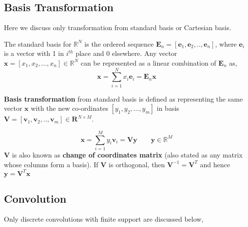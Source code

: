 

\begin{appendices}

\chapter{}
\section{Basis Transformation}

Here we discuss only transformation from standard \gls{basis} or Cartesian \gls{basis}.
\bigskip

\noindent The standard \gls{basis} for $\mathbb{R}^{N}$ is the ordered sequence $\textbf{E}_{n} = [\textbf{e}_{1}, \textbf{e}_{2}, ..,\textbf{e}_{n}]$, where $\textbf{e}_{i}$ is a vector with 1 in $\textit{i}^{th}$ place and 0 elsewhere. Any vector $\textbf{x} = [x_{1}, x_{2},...,x_{n}] \in \mathbb{R}^{N}$ can be represented as a \gls{linear combination} of $\textbf{E}_{n}$ as,
\[
\textbf{x} = \displaystyle\sum_{i=1}^{N}x_{i}\textbf{e}_{i} = \textbf{E}_{n}\textbf{x}
\]

\noindent \textbf{Basis transformation} from standard \gls{basis} is defined as representing the same vector $\textbf{x}$ with the new co-ordinates $[y_{1}, y_{2},...,y_{m}]$ in \gls{basis} $\textbf{V} = [\textbf{v}_{1}, \textbf{v}_{2}, ..,\textbf{v}_{m}] \in \textbf{R}^{N \times M} $.
\bigskip

\[
\textbf{x} = \displaystyle\sum_{i=1}^{M}y_{i}\textbf{v}_{i} = \textbf{V}\textbf{y} \qquad \textbf{y} \in \mathbb{R}^{M}
\]
$\textbf{V}$ is also known as \textbf{change of coordinates matrix} (also stated as any matrix whose columns form a \gls{basis}). If $\textbf{V}$ is orthogonal, then $\textbf{V}^{-1} = \textbf{V}^{T}$ and hence $\textbf{y} = \textbf{V}^{T}\textbf{x}$

\section{Convolution}
Only discrete convolutions with finite support are discussed below,


\end{appendices}
